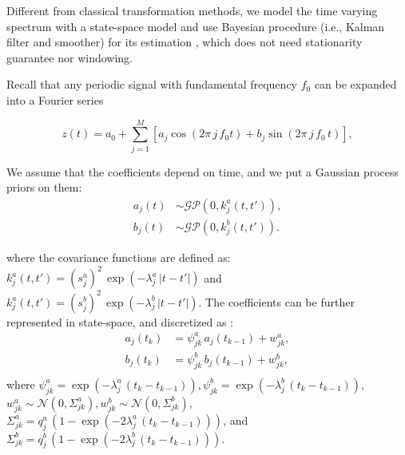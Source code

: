 \documentclass[portrait,a0,final]{a0poster} %
\begin{document}
\begin{minipage}{0.98\linewidth}
\begin{minipage}[t]{0.47\linewidth}
Different from classical transformation methods, we model the time varying spectrum with a state-space model and use Bayesian procedure (i.e., Kalman filter and smoother) for its estimation \cite{qi2002bayesian}, which does not need stationarity guarantee nor windowing. 

Recall that any periodic signal with fundamental frequency $f_0$ can be expanded into a Fourier series

\begin{equation}
z(t) = a_0 + \sum_{j=1}^{M} \left[ a_{j} \cos(2\pi \, j \, f_0 t) + b_{j} \sin(2\pi  \, j \, f_0 \, t) \right],
\label{equ:fourier_series}
\end{equation}

We assume that the coefficients depend on time, and we put a Gaussian process priors on them:
%
\begin{equation}
\begin{split}
a_j(t) &\sim \mathcal{GP}(0,k^a_j(t,t')), \\
b_j(t) &\sim \mathcal{GP}(0,k^b_j(t,t')).
\end{split}
\end{equation}

where the covariance functions are defined as: $k^a_j(t,t') = (s^a_j)^2 \, \exp( -\lambda^a_j \, | t - t' | )$ and $k^a_j(t,t') = (s^b_j)^2 \, \exp( -\lambda^b_j \, | t - t' | )$. The coefficients can be further represented in state-space, and discretized as \cite{Sarkka:2006}: 
%
%
\begin{equation}
\begin{split}
a_j(t_k) &= \psi^a_{jk} \, a_j(t_{k-1}) + w^a_{jk}, \\
b_j(t_k) &= \psi^b_{jk} \, b_j(t_{k-1}) + w^b_{jk}, \\
\end{split}
\label{eq:discdyn}
\end{equation}
%
where $\psi^a_{jk} = \exp(-\lambda^a_j \, (t_k - t_{k-1})), \psi^b_{jk} = \exp(-\lambda^b_j \, (t_k - t_{k-1}))$, $w^a_{jk} \sim \mathcal{N}(0,\Sigma^a_{jk}), w^b_{jk} \sim \mathcal{N}(0,\Sigma^b_{jk})$, $\Sigma^a_{jk} = q^a_j \, (1 - \exp(-2 \lambda^a_j \, (t_k - t_{k-1})))$, and $\Sigma^b_{jk} = q^b_j \, (1 - \exp(-2 \lambda^b_j \, (t_k - t_{k-1})))$.


\end{minipage}
\end{minipage}
\end{document}
